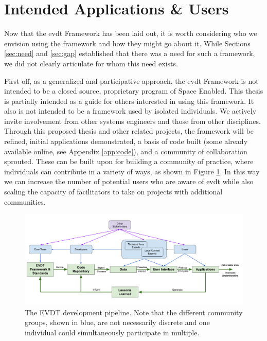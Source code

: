 \section{Intended Applications \& Users} \label{sec:intended}

Now that the \ac{evdt} Framework has been laid out, it is worth considering who we envision using the framework and how they might go about it. While Sections \ref{sec:need} and \ref{sec:gap} established that there was a need for such a framework, we did not clearly articulate for whom this need exists. 

First off, as a generalized and participative approach, the \ac{evdt} Framework is not intended to be a closed source, proprietary program of Space Enabled. This thesis is partially intended as a guide for others interested in using this framework. It also is not intended to be a framework used by isolated individuals. We actively invite involvement from other systems engineers and those from other disciplines. Through this proposed thesis and other related projects, the framework will be refined, initial applications demonstrated, a basis of code built (some already available online, see Appendix \ref{app:code}), and a community of collaboration sprouted. These can be built upon for building a community of practice, where individuals can contribute in a variety of ways, as shown in Figure \ref{fig:development}. In this way we can increase the number of potential users who are aware of \ac{evdt} while also scaling the capacity of facilitators to take on projects with additional communities.

\begin{figure}[!htb]
	\centering
	\includegraphics[scale=0.25]{Figures/chap3/Graphic_2_Development.png}
	\caption[The EVDT development pipeline] {The EVDT development pipeline. Note that the different community groups, shown in blue, are not necessarily discrete and one individual could simultaneously participate in multiple.}
	\label{fig:development}
\end{figure}

